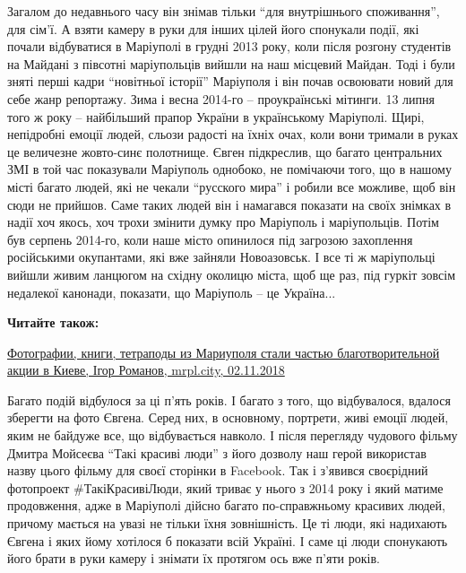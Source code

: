 Загалом до недавнього часу він знімав тільки \enquote{для внутрішнього споживання}, для
сім'ї. А взяти камеру в руки для інших цілей його спонукали події, які почали
відбуватися в Маріуполі в грудні 2013 року, коли після розгону студентів на
Майдані з півсотні маріупольців вийшли на наш місцевий Майдан. Тоді і були
зняті перші кадри \enquote{новітньої історії} Маріуполя і він почав освоювати новий для
себе жанр репортажу. Зима і весна 2014-го – проукраїнські мітинги. 13 липня
того ж року – найбільший прапор України в українському Маріуполі. Щирі,
непідробні емоції людей, сльози радості на їхніх очах, коли вони тримали в
руках це величезне жовто-синє полотнище. Євген підкреслив, що багато
центральних ЗМІ в той час показували Маріуполь однобоко, не помічаючи того, що
в нашому місті багато людей, які не чекали \enquote{русского мира} і робили все
можливе, щоб він сюди не прийшов. Саме таких людей він і намагався показати на
своїх знімках в надії хоч якось, хоч трохи змінити думку про Маріуполь і
маріупольців. Потім був серпень 2014-го, коли наше місто опинилося під загрозою
захоплення російськими окупантами, які вже зайняли Новоазовськ. І все ті ж
маріупольці вийшли живим ланцюгом на східну околицю міста, щоб ще раз, під
гуркіт зовсім недалекої канонади, показати, що Маріуполь – це Україна...

\textbf{Читайте також:} 

\href{https://mrpl.city/news/view/fotografii-knigi-tetrapody-iz-mariupolya-stali-chastyu-blagotvoritelnoj-aktsii-v-kieve-foto}{%
Фотографии, книги, тетраподы из Мариуполя стали частью благотворительной акции в Киеве, %
Ігор Романов, mrpl.city, 02.11.2018%
}

Багато подій відбулося за ці п'ять років. І багато з того, що відбувалося,
вдалося зберегти на фото Євгена. Серед них, в основному, портрети, живі емоції
людей, яким не байдуже все, що відбувається навколо. І після перегляду чудового
фільму Дмитра Мойсеєва \enquote{Такі красиві люди} з його дозволу наш герой використав
назву цього фільму для своєї сторінки в Facebook. Так і з'явився своєрідний
фотопроект \#ТакіКрасивіЛюди, який триває у нього з 2014 року і який матиме
продовження, адже в Маріуполі дійсно багато по-справжньому красивих людей,
причому мається на увазі не тільки їхня зовнішність. Це ті люди, які надихають
Євгена і яких йому хотілося б показати всій Україні. І саме ці люди спонукають
його брати в руки камеру і знімати їх протягом ось вже п'яти років. 


